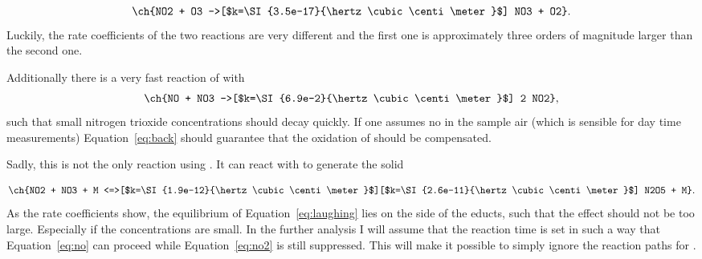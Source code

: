 \begin{align}
  \ch{NO2 + O3 ->[$k=\SI{3.5e-17}{\hertz\cubic\centi\meter}$] NO3
  + O2}. \label{eq:no2}
\end{align}
Luckily, the rate coefficients of the two reactions are very different
and the first one is approximately three orders of magnitude larger
than the second one.

Additionally there is a very fast reaction of  with 
\begin{align}
  \ch{NO + NO3 ->[$k=\SI{6.9e-2}{\hertz\cubic\centi\meter}$] 2 NO2},\label{eq:back}
\end{align}
such that small nitrogen trioxide concentrations should decay
quickly. If one assumes no  in the sample air (which is sensible
for day time measurements) Equation~\eqref{eq:back} should guarantee
that the oxidation of  should be compensated. 

Sadly, this is not the only reaction using . It can react
with  to generate the solid 

\begin{align}
  \ch{NO2 + NO3 + M
  <=>[$k=\SI{1.9e-12}{\hertz\cubic\centi\meter}$][$k=\SI{2.6e-11}{\hertz\cubic\centi\meter}$]
  N2O5 + M}. \label{eq:laughing}
\end{align}
As the rate coefficients show, the equilibrium of
Equation~\eqref{eq:laughing} lies on the side of the educts, such that
the effect should not be too large. Especially if the 
concentrations are small. In the further analysis I will assume that
the reaction time is set in such a way that Equation~\eqref{eq:no}
can proceed while Equation~\eqref{eq:no2} is still suppressed. This
will make it possible to simply ignore the reaction paths for .

